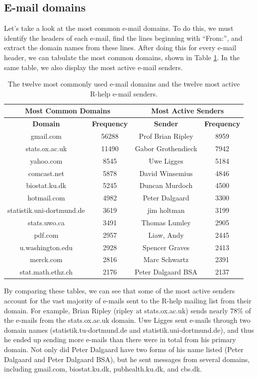 \documentclass[12pt, a4paper, oneside]{amsart}
\begin{document}
\subsection{E-mail domains}

Let's take a look at the most common e-mail domains.  To do this, we must identify the headers of each e-mail, find the lines beginning with ``From:'', and extract the domain names from these lines.  After doing this for every e-mail header, we can tabulate the most common domains, shown in Table \ref{table:domains}.  In the same table, we also display the most active e-mail senders.

 \begin{table}[ht]
 \centering
 \begin{tabular}{|c|c||c|c|}
 \hline
\multicolumn{2}{|c||}{Most Common Domains} & \multicolumn{2}{|c|}{Most Active Senders}\\
\hline
\footnotesize{\textbf{Domain}}& \footnotesize{\textbf{Frequency}} & \footnotesize{\textbf{Sender}}& \footnotesize{\textbf{Frequency}}\\
\hline
gmail.com & 56288 & Prof Brian Ripley & 8959 \\
stats.ox.ac.uk &11490 & Gabor Grothendieck & 7942\\
yahoo.com & 8545 & Uwe Ligges & 5184\\
comcast.net & 5878 & David Winsemius & 4846\\
biostat.ku.dk & 5245 & Duncan Murdoch & 4500\\
hotmail.com & 4982 & Peter Dalgaard & 3300\\
statistik.uni-dortmund.de & 3619 & jim holtman & 3199\\
stats.uwo.ca & 3491 & Thomas Lumley & 2905\\
pdf.com & 2957 & Liaw, Andy & 2445\\
u.washington.edu & 2928 & Spencer Graves & 2413\\
merck.com & 2816 & Marc Schwartz & 2391\\
stat.math.ethz.ch & 2176 & Peter Dalgaard BSA & 2137\\
\hline
\end{tabular}
\caption{The twelve most commonly used e-mail domains and the twelve most active R-help e-mail senders.}
\label{table:domains}
\end{table} 

By comparing these tables, we can see that some of the most active senders account for the vast majority of e-mails sent to the R-help mailing list from their domain.  For example, Brian Ripley (ripley at stats.ox.ac.uk) sends nearly 78\% of the e-mails from the stats.ox.ac.uk domain.  Uwe Ligges sent e-mails through two domain names (statistik.tu-dortmund.de and statistik.uni-dortmund.de), and thus he ended up sending more e-mails than there were in total from his primary domain.  Not only did Peter Dalgaard have two forms of his name listed (Peter Dalgaard and Peter Dalgaard BSA), but he sent messages from several domains, including gmail.com, biostat.ku.dk, pubhealth.ku.dk, and cbs.dk.
\end{document}
